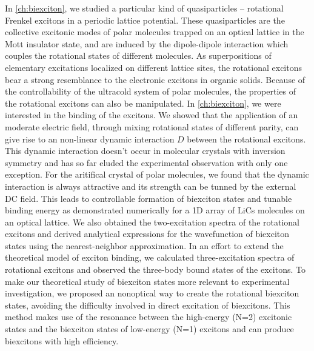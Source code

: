 In \autoref{ch:biexciton}, we studied a particular kind of quasiparticles -- rotational Frenkel excitons in a 
periodic lattice potential. These quasiparticles are the collective excitonic modes of polar molecules 
trapped on an optical lattice in the Mott insulator state, and are induced by the dipole-dipole interaction which couples the 
rotational states of different molecules. As superpositions of elementary excitations localized on different
 lattice sites, the rotational excitons  bear a strong resemblance to the electronic excitons in organic solids\cite{agranovich}.
Because of the controllability of the ultracold system of polar molecules, the properties of the rotational excitons can also 
be manipulated. In \autoref{ch:biexciton}, we were interested in the binding of the excitons. 
We showed that the application of an moderate electric field,  through mixing rotational states of different parity, can give rise 
to an non-linear dynamic interaction $D$ between the rotational excitons.  This dynamic interaction doesn't occur in molecular crystals 
with inversion symmetry and has so far eluded the experimental observation with only one exception\cite{frenkelxx, 
frenkelxx2}. For the aritifical crystal of polar molecules, we found that the dynamic interaction is always attractive and its 
strength can be tunned by the external DC field. This leads to controllable formation of biexciton states and tunable binding
energy as demonstrated numerically for a 1D array of LiCs molecules on an optical lattice. We also obtained the 
two-excitation spectra of the rotational excitons and derived analytical expressions for the wavefunction of biexciton states 
using the nearest-neighbor approximation. In an effort to extend the theoretical model of exciton binding, we calculated 
three-excitation spectra of rotational excitons and observed the three-body bound states of the excitons.
To make our theoretical study of biexciton states more relevant to experimental investigation, we proposed an nonoptical way to create the rotational biexciton states, avoiding the difficulty involved in 
direct excitation of biexcitons. This method makes use of the resonance between the high-energy (N=2) excitonic states 
and the biexciton states of low-energy (N=1) excitons and can produce biexcitons with high efficiency. 



